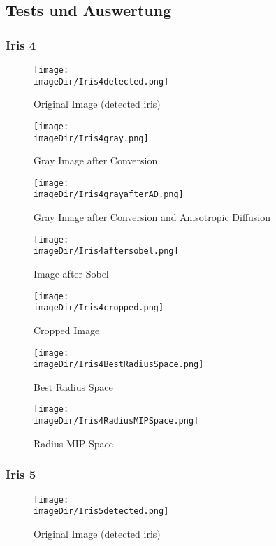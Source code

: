\documentclass[11pt, a4paper, twoside]{article}   	%
\newcommand{\imageDir}{images}
\begin{document}
\newpage
\subsection{Tests und Auswertung}
\label{TestsUndAuswertung}
\subsubsection{Iris 4}
\begin{figure}[H]
	\centering
	\texttt{[image: \\imageDir/Iris4detected.png]}
	\caption{Original Image (detected iris)}
\end{figure}

\begin{figure}[H]
	\centering
	\texttt{[image: \\imageDir/Iris4gray.png]}
	\caption{Gray Image after Conversion}
\end{figure}

\begin{figure}[H]
	\centering
	\texttt{[image: \\imageDir/Iris4grayafterAD.png]}
	\caption{Gray Image after Conversion and Anisotropic Diffusion}
\end{figure}

\begin{figure}[H]
	\centering
	\texttt{[image: \\imageDir/Iris4aftersobel.png]}
	\caption{Image after Sobel}
\end{figure}

\begin{figure}[H]
	\centering
	\texttt{[image: \\imageDir/Iris4cropped.png]}
	\caption{Cropped Image}
\end{figure}

\begin{figure}[H]
	\centering
	\texttt{[image: \\imageDir/Iris4BestRadiusSpace.png]}
	\caption{Best Radius Space}
\end{figure}

\begin{figure}[H]
	\centering
	\texttt{[image: \\imageDir/Iris4RadiusMIPSpace.png]}
	\caption{Radius MIP Space}
\end{figure}

\newpage
\subsubsection{Iris 5}
\begin{figure}[H]
	\centering
	\texttt{[image: \\imageDir/Iris5detected.png]}
	\caption{Original Image (detected iris)}
\end{figure}
\end{document}
